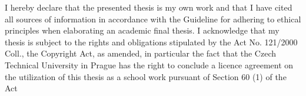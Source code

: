 \documentclass[english,bachelor,unicode,twoside]{ctufit-thesis}
\theoremstyle{plain}
\theoremstyle{definition}
\theoremstyle{remark}
\numberwithin{theorem}{chapter}
\begin{document}
\begin{declarationpage}
I hereby declare that the presented thesis is my own work and that I have cited all sources of
information in accordance with the Guideline for adhering to ethical principles when elaborating an
academic final thesis.
I acknowledge that my thesis is subject to the rights and obligations stipulated by the Act No.
121/2000 Coll., the Copyright Act, as amended, in particular the fact that the Czech Technical
University in Prague has the right to conclude a licence agreement on the utilization of this thesis as
a school work pursuant of Section 60 (1) of the Act
\end{declarationpage}

\printabstractpage %


% 
% 
% 
% 
% 
% 
% 
% 
% 
\end{document}
